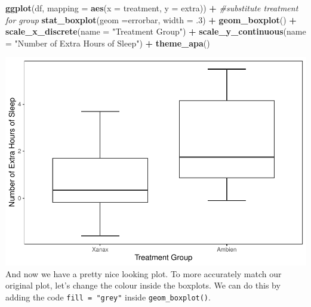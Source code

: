 \documentclass[
]{book}
\newenvironment{Shaded}{\begin{snugshade}}{\end{snugshade}}
\newcommand{\AttributeTok}[1]{\textcolor[rgb]{0.13,0.29,0.53}{#1}}
\newcommand{\CommentTok}[1]{\textcolor[rgb]{0.56,0.35,0.01}{\textit{#1}}}
\newcommand{\DecValTok}[1]{\textcolor[rgb]{0.00,0.00,0.81}{#1}}
\newcommand{\FunctionTok}[1]{\textcolor[rgb]{0.13,0.29,0.53}{\textbf{#1}}}
\newcommand{\NormalTok}[1]{#1}
\newcommand{\SpecialCharTok}[1]{\textcolor[rgb]{0.81,0.36,0.00}{\textbf{#1}}}
\newcommand{\StringTok}[1]{\textcolor[rgb]{0.31,0.60,0.02}{#1}}
\begin{document}
\begin{Shaded}
\begin{Highlighting}[]
\FunctionTok{ggplot}\NormalTok{(df, }\AttributeTok{mapping =} \FunctionTok{aes}\NormalTok{(}\AttributeTok{x =}\NormalTok{ treatment, }\AttributeTok{y =}\NormalTok{ extra)) }\SpecialCharTok{+} \CommentTok{\#substitute treatment for group}
  \FunctionTok{stat\_boxplot}\NormalTok{(}\AttributeTok{geom =}\StringTok{\textquotesingle{}errorbar\textquotesingle{}}\NormalTok{, }\AttributeTok{width =}\NormalTok{ .}\DecValTok{3}\NormalTok{) }\SpecialCharTok{+}
  \FunctionTok{geom\_boxplot}\NormalTok{() }\SpecialCharTok{+} 
  \FunctionTok{scale\_x\_discrete}\NormalTok{(}\AttributeTok{name =} \StringTok{"Treatment Group"}\NormalTok{) }\SpecialCharTok{+} 
  \FunctionTok{scale\_y\_continuous}\NormalTok{(}\AttributeTok{name =} \StringTok{"Number of Extra Hours of Sleep"}\NormalTok{) }\SpecialCharTok{+}
  \FunctionTok{theme\_apa}\NormalTok{()}
\end{Highlighting}
\end{Shaded}

\includegraphics{rintro_demo_files/figure-latex/unnamed-chunk-291-1.pdf}
And now we have a pretty nice looking plot. To more accurately match our original plot, let's change the colour inside the boxplots. We can do this by adding the code \texttt{fill\ =\ "grey"} inside \texttt{geom\_boxplot()}.
\end{document}
